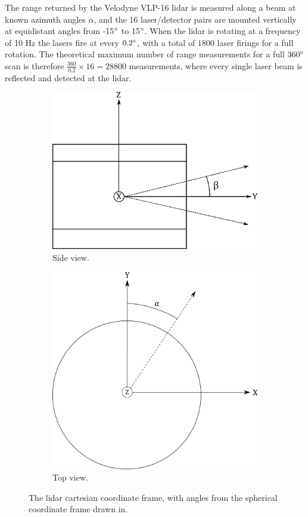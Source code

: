 The range returned by the Velodyne VLP-16 lidar is measured along a beam at known azimuth angles $\alpha$, and the 16 laser/detector pairs are mounted vertically at equidistant angles from -15$\degree$ to 15$\degree$. When the lidar is rotating at a frequency of 10 Hz the lasers fire at every $0.2\degree$, with a total of $1800$ laser firings for a full rotation. The theoretical maximum number of range measurements for a full $360\degree$ scan is therefore $\frac{360}{0.2}\times16=28800$ measurements, where every single laser beam is reflected and detected at the lidar.
\begin{figure}[H]
	\centering
	\begin{subfigure}{.5\textwidth}
		\centering
		\includegraphics[width=.7\linewidth]{fig/lidar_side.png}
		\caption{Side view.}
		\label{fig:sub_lidarframe}
	\end{subfigure}%
	\begin{subfigure}{.5\textwidth}
		\centering
		\includegraphics[width=.7\linewidth]{fig/lidar_top.png}
		\caption{Top view.}
		\label{fig:sub_lidarframe2}
	\end{subfigure}
	\caption{The lidar cartesian coordinate frame, with angles from the spherical coordinate frame drawn in.}
	\label{fig:lidar_frames}
\end{figure}

